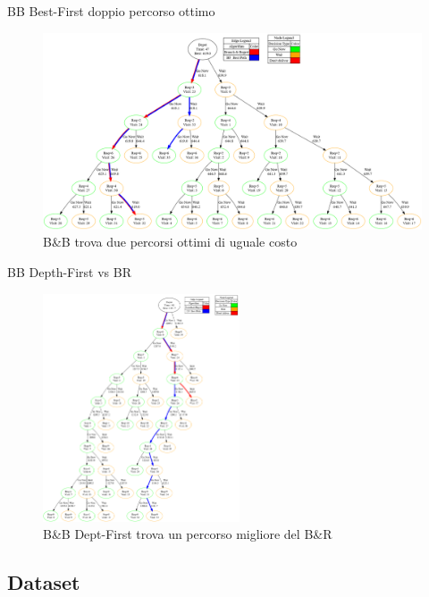 \documentclass[10pt]{beamer}
\begin{document}
    \begin{frame}{BB Best-First doppio percorso ottimo}
        \begin{figure}[h!]
            \centering
            \includegraphics[width=1\textwidth]{Images/raro.png}
            \caption{B\&B trova due percorsi ottimi di uguale costo}
            \label{fig:BBBFduepath}
        \end{figure}
    \end{frame}

    \begin{frame}{BB Depth-First vs BR}
           \begin{figure}[h!]
                \centering
                \includegraphics[width=0.52\textwidth]{Images/good_shit.png}
                \caption{B\&B Dept-First trova un percorso migliore del B\&R}
                \label{fig:BBDFmigliore}
            \end{figure}
    \end{frame}
    
    \subsection{Dataset}\label{sec:Dataset}
\end{document}
